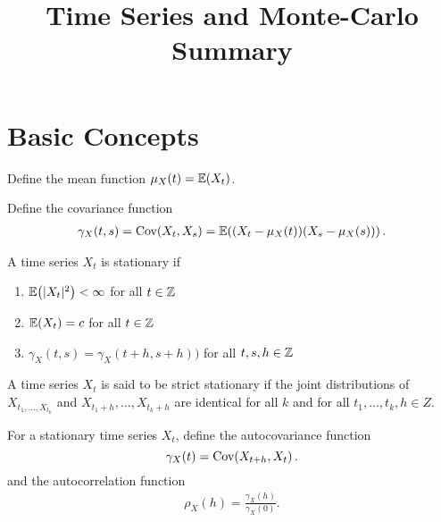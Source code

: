 

\title{Time Series and Monte-Carlo Summary}



\maketitle

\section{Basic Concepts}
\label{sec:basic-concepts}

\begin{defn}
  \label{defn:time_series:7}
  Define the mean function $\mu_{X}(t) = \E{X_{t}}$.

  Define the covariance function
  \begin{align}
    \gamma_{X}(t, s) = \Cov{X_{t}}{X_{s}} = \E{(X_{t} -
      \mu_{X}(t))(X_{s} - \mu_{X}(s))}.\label{eq:11}
  \end{align}
\end{defn}

\begin{defn}
  \label{defn:time_series:6}
  A time series $X_{t}$ is stationary if
  \begin{enumerate}
  \item $\E{|X_t|^2} < \infty$ for all $t \in \mathbb{Z}$
  \item $\E{X_{t}} = c$ for all $t \in \mathbb{Z}$
  \item $\gamma_{X}(t, s) = \gamma_{X}(t+h, s+h))$ for all $t, s, h
    \in \mathbb{Z}$
  \end{enumerate}
\end{defn}

\begin{defn}
  \label{defn:time_series:8}
  A time series $X_{t}$ is said to be strict stationary if the joint
  distributions of $X_{t_{1}, \dots, X_{t_{k}}}$ and $X_{t_{1} + h},
  \dots, X_{t_{k} + h}$ are identical for all $k$ and for all $t_{1},
  \dots, t_{k}, h \in Z$.
\end{defn}

\begin{defn}
  \label{defn:time_series:9}
  For a stationary time series $X_{t}$, define the autocovariance
  function
  \begin{equation}
    \label{eq:2}
    \gamma_{X}(t) = \Cov{X_{t+h}}{X_{t}}.
  \end{equation}
  and the autocorrelation function
  \begin{align}
    \label{eq:3}
    \rho_{X}(h) = \frac{\gamma_{X}(h)}{\gamma_{X}(0)}.
  \end{align}
\end{defn}

